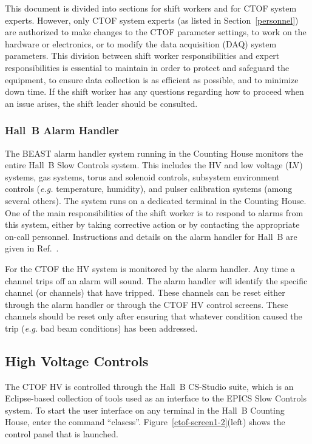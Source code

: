 \documentclass[12pt]{article}
\begin{document}
This document is divided into sections for shift workers and for CTOF system experts. However, only CTOF
system experts (as listed in Section~\ref{personnel}) are authorized to make changes to the CTOF parameter
settings, to work on the hardware or electronics, or to modify the data acquisition (DAQ) system parameters.
This division between shift worker responsibilities and expert responsibilities is essential to maintain in
order to protect and safeguard the equipment, to ensure data collection is as efficient as possible, and to
minimize down time. If the shift worker has any questions regarding how to proceed when an issue arises, the
shift leader should be consulted.

\subsubsection{Hall~B Alarm Handler}
\label{alarms}

The BEAST alarm handler system running in the Counting House monitors the entire Hall~B Slow Controls
system. This includes the HV and low voltage (LV) systems, gas systems, torus and solenoid controls,
subsystem environment controls ({\it e.g.} temperature, humidity), and pulser calibration systems (among
several others). The system runs on a dedicated terminal in the Counting House. One of the main
responsibilities of the shift worker is to respond to alarms from this system, either by taking corrective
action or by contacting the appropriate on-call personnel. Instructions and details on the alarm handler
for Hall~B are given in Ref.~\cite{beast}.

For the CTOF the HV system is monitored by the alarm handler. Any time a channel trips off an alarm will
sound. The alarm handler will identify the specific channel (or channels) that have tripped. These channels 
can be reset either through the alarm handler or through the CTOF HV control screens. These channels should
be reset only after ensuring that whatever condition caused the trip ({\it e.g.} bad beam conditions) has
been addressed. 

\subsection{High Voltage Controls}
\label{hv-control}

The CTOF HV is controlled through the Hall~B CS-Studio suite, which is an Eclipse-based collection of tools
used as an interface to the EPICS Slow Controls system. To start the user interface on any terminal in the
Hall~B Counting House, enter the command ``clascss''. Figure~\ref{ctof-screen1-2}(left) shows the control
panel that is launched.
\end{document}
